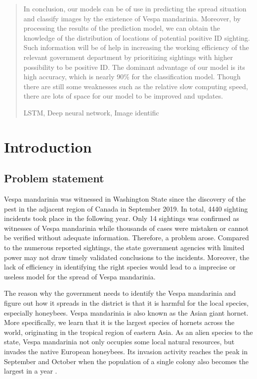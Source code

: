 \documentclass{mcmthesis}
\begin{document}
\begin{abstract}
In conclusion, our models can be of use in predicting the spread situation and classify images by the existence of Vespa mandarinia. Moreover, by processing the results of the prediction model, we can obtain the knowledge of the distribution of locations of potential positive ID sighting. Such information will be of help in increasing the working efficiency of the relevant government department by prioritizing sightings with higher possibility to be positive ID. The dominant advantage of our model is its high accuracy, which is nearly 90\% for the classification model. Though there are still some weaknesses such as the relative slow computing speed, there are lots of space for our model to be improved and updates. 

	\begin{keywords}
	LSTM, Deep neural network, Image identific
	\end{keywords}
\end{abstract}

\maketitle

\tableofcontents
\newpage

\section{Introduction}

\subsection{Problem statement}
Vespa mandarinia was witnessed in Washington State since the discovery of the pest in the adjacent region of Canada in September 2019. In total, 4440 sighting incidents took place in the following year. Only 14 sightings was confirmed as witnesses of Vespa mandarinia while thousands of cases were mistaken or cannot be verified without adequate information. Therefore, a problem arose. Compared to the numerous reported sightings, the state government agencies with limited power may not draw timely validated conclusions to the incidents. Moreover, the lack of efficiency in identifying the right species would lead to a imprecise or useless model for the spread of Vespa mandarinia.

The reason why the government needs to identify the Vespa mandarinia and figure out how it spreads in the district is that it is harmful for the local species, especially honeybees. Vespa mandarinia is also known as the Asian giant hornet. More specifically, we learn that it is the largest species of hornets across the world, originating in the tropical region of eastern Asia. As an alien species to the state, Vespa mandarinia not only occupies some local natural resources, but invades the native European honeybees. Its invasion activity reaches the peak in September and October when the population of a single colony also becomes the largest in a year \cite{AGH}.
\end{document}
